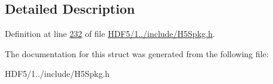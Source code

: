 \subsection{Detailed Description}


Definition at line \hyperlink{_h_d_f5_21_810_81_2include_2_h5_spkg_8h_source_l00232}{232} of file \hyperlink{_h_d_f5_21_810_81_2include_2_h5_spkg_8h_source}{H\+D\+F5/1../include/\+H5\+Spkg.\+h}.



The documentation for this struct was generated from the following file\+:\begin{DoxyCompactItemize}
\item 
H\+D\+F5/1../include/\+H5\+Spkg.\+h\end{DoxyCompactItemize}
